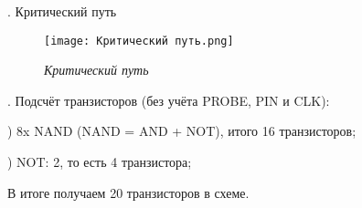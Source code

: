 \documentclass[a4paper,12pt]{article}
\begin{document}
. Критический путь
\begin{figure}[H]
	\begin{center}
		\texttt{[image: Критический путь.png]}
	\end{center}
	\caption{\textit{Критический путь}}
	\label{ust}
        \end{figure}

. Подсчёт транзисторов (без учёта PROBE, PIN и CLK):

) 8x NAND (NAND = AND + NOT), итого 16 транзисторов;

) NOT: 2, то есть 4 транзистора;

\newline
В итоге получаем 20 транзисторов в схеме.
\end{document}

